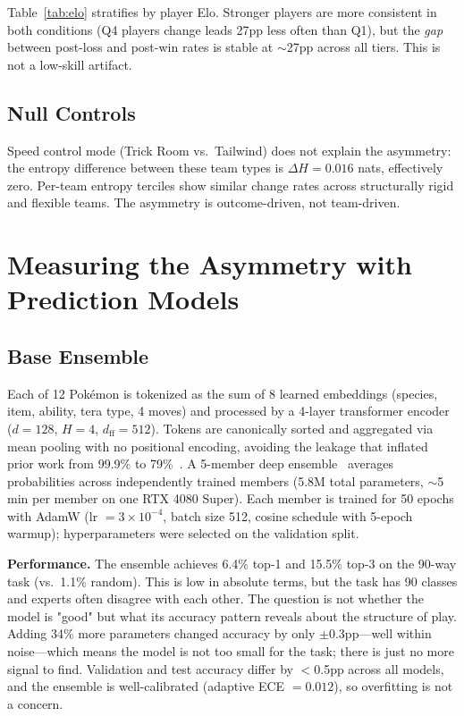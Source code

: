 \documentclass{article}
\begin{document}
Table~\ref{tab:elo} stratifies by player Elo.
Stronger players are more consistent in both conditions (Q4 players change leads 27pp less often than Q1), but the \emph{gap} between post-loss and post-win rates is stable at ${\sim}$27pp across all tiers.
This is not a low-skill artifact.

\subsection{Null Controls}
\label{sec:nulls}

Speed control mode (Trick Room vs.\ Tailwind) does not explain the asymmetry: the entropy difference between these team types is $\Delta H = 0.016$ nats, effectively zero.
Per-team entropy terciles show similar change rates across structurally rigid and flexible teams.
The asymmetry is outcome-driven, not team-driven.


\section{Measuring the Asymmetry with Prediction Models}
\label{sec:models}

\subsection{Base Ensemble}
\label{sec:base}

Each of 12 Pok\'emon is tokenized as the sum of 8 learned embeddings (species, item, ability, tera type, 4 moves) and processed by a 4-layer transformer encoder ($d{=}128$, $H{=}4$, $d_{\text{ff}}{=}512$).
Tokens are canonically sorted and aggregated via mean pooling with no positional encoding, avoiding the leakage that inflated prior work from 99.9\% to 79\%~\cite{elitefurretai}.
A 5-member deep ensemble~\cite{deepensembles} averages probabilities across independently trained members (5.8M total parameters, ${\sim}$5 min per member on one RTX 4080 Super).
Each member is trained for 50 epochs with AdamW (lr $= 3\times10^{-4}$, batch size 512, cosine schedule with 5-epoch warmup); hyperparameters were selected on the validation split.

\textbf{Performance.}
The ensemble achieves 6.4\% top-1 and 15.5\% top-3 on the 90-way task (vs.\ 1.1\% random).
This is low in absolute terms, but the task has 90 classes and experts often disagree with each other. The question is not whether the model is "good" but what its accuracy pattern reveals about the structure of play.
Adding 34\% more parameters changed accuracy by only $\pm$0.3pp---well within noise---which means the model is not too small for the task; there is just no more signal to find.
Validation and test accuracy differ by $<$0.5pp across all models, and the ensemble is well-calibrated (adaptive ECE $= 0.012$), so overfitting is not a concern.
\end{document}
